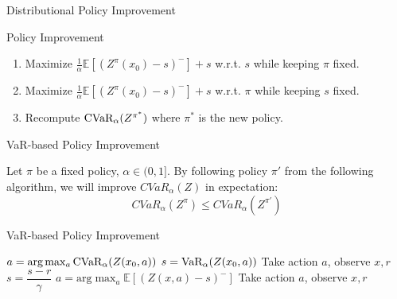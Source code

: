 \documentclass{beamer}
\begin{document}

\begin{frame}{Distributional Policy Improvement}

\begin{block}{Policy Improvement}
\begin{enumerate}
\item Maximize $\frac{1}{\alpha}\mathbb{E}\left[ (Z^\pi(x_0)-s)^-\right] + s$ w.r.t. $s$ while keeping $\pi$ fixed.

\bigskip
\item Maximize $\frac{1}{\alpha}\mathbb{E}\left[ (Z^\pi(x_0)-s)^-\right] + s$ w.r.t. $\pi$ while keeping $s$ fixed.

\bigskip
\item Recompute $\text{CVaR}_\alpha (Z^{\pi^*})$ where $\pi^*$ is the new policy.
\end{enumerate}
\end{block}
\end{frame}



\begin{frame}{VaR-based Policy Improvement}
\begin{theorem}
Let $\pi$ be a fixed policy, $\alpha \in (0, 1]$. By following policy $\pi'$ from the following algorithm, we will improve $CVaR_\alpha(Z)$ in expectation: $$CVaR_\alpha(Z^\pi) \le CVaR_\alpha(Z^{\pi'})$$
\end{theorem}
\begin{block}{VaR-based Policy Improvement}
\begin{algorithmic}
    \STATE $a = \text{arg}\max_a \text{CVaR}_\alpha(Z(x_0, a))$
    \STATE $s = \text{VaR}_\alpha(Z(x_0, a))$
    \STATE Take action $a$, observe $x, r$
    	\STATE $s = \dfrac{s-r}{\gamma}$
    	\STATE $a = \text{arg}\max_a \mathbb{E}\left[(Z(x, a)-s)^- \right]$
    	\STATE Take action $a$, observe $x, r$
   	\ENDWHILE
\end{algorithmic}
\end{block}
\end{frame}

\end{document}
